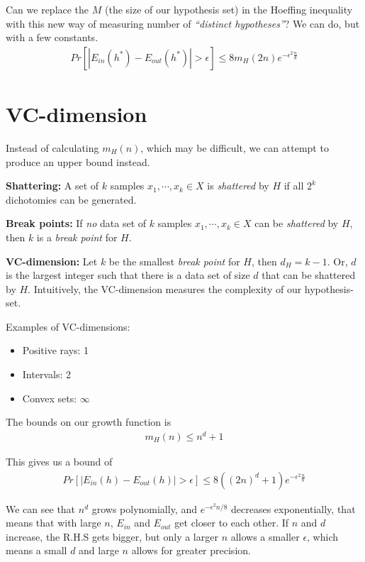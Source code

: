 \documentclass{article}
\begin{document}
  Can we replace the $M$ (the size of our hypothesis set) in the Hoeffing inequality with this new way of measuring number of \emph{``distinct hypotheses''}? We can do, but with a few constants.
  \begin{align}
    Pr[|E_{in}(h^*) - E_{out}(h^*)| > \epsilon] \leq 8m_H(2n)e^{-\epsilon^2 \frac{n}{8}}
  \end{align}

\section{VC-dimension}
  Instead of calculating $m_H(n)$, which may be difficult, we can attempt to produce an upper bound instead. 
  
  \textbf{Shattering:} A set of $k$ samples $x_1, \cdots, x_k \in X$ is \emph{shattered} by $H$ if all $2^k$ dichotomies can be generated. 

  \textbf{Break points:} If \emph{no} data set of $k$ samples $x_1, \cdots, x_k \in X$ can be \emph{shattered} by $H$, then $k$ is a \emph{break point} for $H$. 

  \textbf{VC-dimension:} Let $k$ be the smallest \emph{break point} for $H$, then $d_H = k - 1$. Or, $d$ is the largest integer such that there is a data set of size $d$ that can be shattered by $H$. Intuitively, the VC-dimension measures the complexity of our hypothesis-set. 

  Examples of VC-dimensions:
  \begin{itemize}
    \item Positive rays: 1
    \item Intervals: 2
    \item Convex sets: $\infty$
  \end{itemize}

  The bounds on our growth function is
  \begin{align}
    m_H(n) \leq n^d + 1
  \end{align}
  
  This gives us a bound of
  \begin{align}
    Pr[|E_{in}(h) - E_{out}(h)| > \epsilon] \leq 8((2n)^d+1)e^{-\epsilon^2 \frac{n}{8}}
  \end{align}

  We can see that $n^d$ grows polynomially, and $e^{-\epsilon^2 n/8}$ decreases exponentially, that means that with large $n$, $E_{in}$ and $E_{out}$ get closer to each other. If $n$ and $d$ increase, the R.H.S gets bigger, but only a larger $n$ allows a smaller $\epsilon$, which means a small $d$ and large $n$ allows for greater precision.
\end{document}
